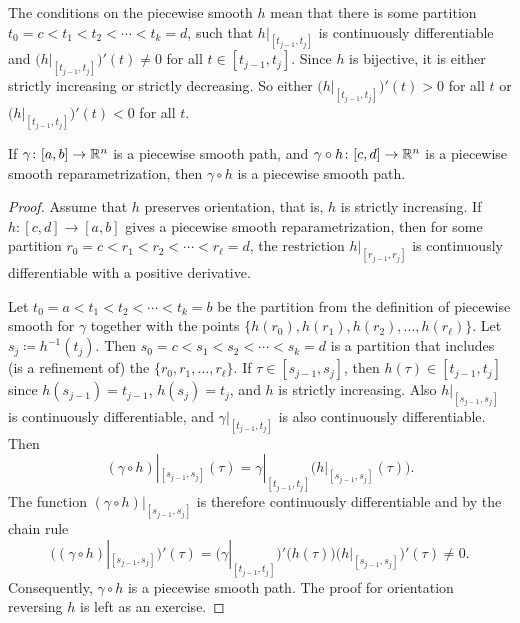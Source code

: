 The conditions on the piecewise smooth $h$ mean that
there is some partition $t_0 = c < t_1 < t_2 < \cdots < t_k = d$,
such that $h|_{[t_{j-1},t_j]}$ is continuously differentiable
and $\bigl(h|_{[t_{j-1},t_j]}\bigr)'(t) \neq 0$
for all $t \in [t_{j-1},t_j]$.
Since $h$ is bijective, it is either strictly increasing or
strictly decreasing.  So either $\bigl(h|_{[t_{j-1},t_j]}\bigr)'(t) > 0$
for all $t$ or $\bigl(h|_{[t_{j-1},t_j]}\bigr)'(t) < 0$ for all $t$.

\begin{prop} \label{prop:reparamapiecewisesmooth}
If $\gamma \colon [a,b] \to {\mathbb{R}}^n$ is a piecewise smooth path,
and $\gamma \circ h \colon [c,d] \to {\mathbb{R}}^n$ is
a piecewise smooth reparametrization, then $\gamma \circ h$
is a piecewise smooth path.
\end{prop}

\begin{proof}
Assume that $h$ preserves orientation, that is, $h$ is strictly
increasing.
If $h \colon [c,d] \to [a,b]$ gives a piecewise smooth reparametrization,
then for some partition
$r_0 = c < r_1 < r_2 < \cdots < r_\ell = d$, the restriction
$h|_{[r_{j-1},r_j]}$ is continuously differentiable with a positive
derivative.

Let $t_0 = a < t_1 < t_2 < \cdots < t_k = b$ be the partition from the
definition of piecewise smooth for $\gamma$ together with the 
points $\{ h(r_0), h(r_1), h(r_2), \ldots, h(r_\ell) \}$.
Let $s_j \coloneqq h^{-1}(t_j)$.  Then
$s_0 = c < s_1 < s_2 < \cdots < s_k = d$
is a partition that includes (is a refinement of) the
$\{ r_0,r_1,\ldots,r_\ell \}$.
If $\tau \in [s_{j-1},s_j]$, then $h(\tau) \in [t_{j-1},t_j]$
since $h(s_{j-1}) = t_{j-1}$,
$h(s_{j}) = t_j$, and
$h$ is strictly increasing.
Also $h|_{[s_{j-1},s_j]}$ is continuously differentiable, and
$\gamma|_{[t_{j-1},t_j]}$ is also continuously differentiable.
Then
\begin{equation*}
(\gamma \circ h)|_{[s_{j-1},s_{j}]} (\tau)
=
\gamma|_{[t_{j-1},t_{j}]} \bigl( h|_{[s_{j-1},s_j]}(\tau) \bigr) .
\end{equation*}
The function 
$(\gamma \circ h)|_{[s_{j-1},s_{j}]}$ is therefore continuously
differentiable and
by the chain rule
\begin{equation*}
\bigl( (\gamma \circ h)|_{[s_{j-1},s_{j}]} \bigr) ' (\tau)
=
\bigl( \gamma|_{[t_{j-1},t_{j}]} \bigr)' \bigl( h(\tau) \bigr)
\bigl(h|_{[s_{j-1},s_j]}\bigr)'(\tau) \neq 0 .
\end{equation*}
Consequently, $\gamma \circ h$ is a piecewise smooth path.
The proof for orientation reversing $h$ is left as an exercise.
\end{proof}

